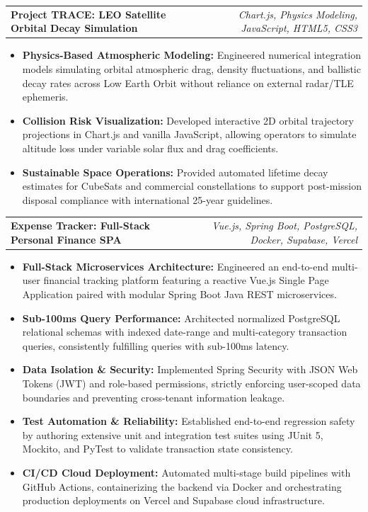 \documentclass[letterpaper,10pt]{article}
\makeatletter
\newcommand{\resumeItem}[1]{\item\small{#1}\vspace{-1.5pt}}
\newcommand{\resumeProjectHeading}[2]{%
  \item
  \begin{tabular*}{\linewidth}[t]{@{}l@{\extracolsep{\fill}}r@{}}
    \textbf{#1} & \textit{\small #2} \\
  \end{tabular*}\vspace{-3pt}
}
\newcommand{\resumeItemList}{\begin{itemize}[leftmargin=0.25in, itemsep=2pt]}
\newcommand{\resumeItemListEnd}{\end{itemize}\vspace{1pt}}
\makeatother
\begin{document}
  \resumeProjectHeading
    {Project TRACE: LEO Satellite Orbital Decay Simulation}{Chart.js, Physics Modeling, JavaScript, HTML5, CSS3}
  \resumeItemList
    \resumeItem{\textbf{Physics-Based Atmospheric Modeling:} Engineered numerical integration models simulating orbital atmospheric drag, density fluctuations, and ballistic decay rates across Low Earth Orbit without reliance on external radar/TLE ephemeris.}
    \resumeItem{\textbf{Collision Risk Visualization:} Developed interactive 2D orbital trajectory projections in Chart.js and vanilla JavaScript, allowing operators to simulate altitude loss under variable solar flux and drag coefficients.}
    \resumeItem{\textbf{Sustainable Space Operations:} Provided automated lifetime decay estimates for CubeSats and commercial constellations to support post-mission disposal compliance with international 25-year guidelines.}
  \resumeItemListEnd

  \resumeProjectHeading
    {Expense Tracker: Full-Stack Personal Finance SPA}{Vue.js, Spring Boot, PostgreSQL, Docker, Supabase, Vercel}
  \resumeItemList
    \resumeItem{\textbf{Full-Stack Microservices Architecture:} Engineered an end-to-end multi-user financial tracking platform featuring a reactive Vue.js Single Page Application paired with modular Spring Boot Java REST microservices.}
    \resumeItem{\textbf{Sub-100ms Query Performance:} Architected normalized PostgreSQL relational schemas with indexed date-range and multi-category transaction queries, consistently fulfilling queries with sub-100ms latency.}
    \resumeItem{\textbf{Data Isolation \& Security:} Implemented Spring Security with JSON Web Tokens (JWT) and role-based permissions, strictly enforcing user-scoped data boundaries and preventing cross-tenant information leakage.}
    \resumeItem{\textbf{Test Automation \& Reliability:} Established end-to-end regression safety by authoring extensive unit and integration test suites using JUnit 5, Mockito, and PyTest to validate transaction state consistency.}
    \resumeItem{\textbf{CI/CD Cloud Deployment:} Automated multi-stage build pipelines with GitHub Actions, containerizing the backend via Docker and orchestrating production deployments on Vercel and Supabase cloud infrastructure.}
  \resumeItemListEnd
\end{document}
